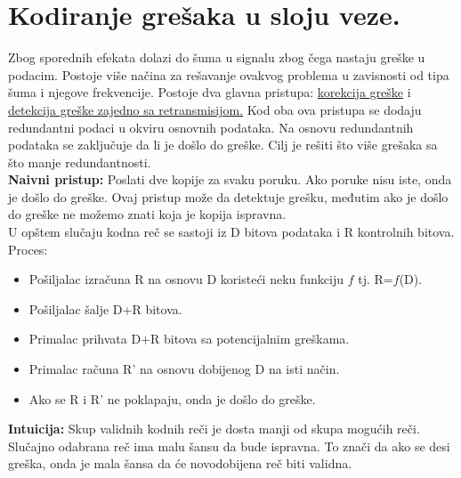 \documentclass[a4paper]{article}
\begin{document}
\section{Kodiranje grešaka u sloju veze.}
    Zbog sporednih efekata dolazi do šuma u signalu zbog čega nastaju greške u podacim. Postoje
    više načina za rešavanje ovakvog problema u zavisnosti od tipa šuma i njegove frekvencije.
    Postoje dva glavna pristupa: \underline{korekcija greške} i \underline{detekcija greške zajedno sa 
    retransmisijom.}
    Kod oba ova pristupa se dodaju redundantni podaci u okviru osnovnih podataka. Na osnovu
    redundantnih podataka se zaključuje da li je došlo do greške. Cilj je rešiti što više grešaka
    sa što manje redundantnosti.\\

    \textbf{Naivni pristup:} Poslati dve kopije za svaku poruku. Ako poruke nisu iste, onda je došlo
    do greške. Ovaj pristup može da detektuje grešku, međutim ako je došlo do greške ne možemo znati
    koja je kopija ispravna.\\

    U opštem slučaju kodna reč se sastoji iz D bitova podataka i R kontrolnih bitova. Proces:
    \begin{itemize}
        \item Pošiljalac izračuna R na osnovu D koristeći neku funkciju $f$ tj. R=$f$(D). 
        \item Pošiljalac šalje D+R bitova. 
        \item Primalac prihvata D+R bitova sa potencijalnim greškama. 
        \item Primalac računa R' na osnovu dobijenog D na isti način. 
        \item Ako se R i R' ne poklapaju, onda je došlo do greške.
    \end{itemize}

    \textbf{Intuicija:} Skup validnih kodnih reči je dosta manji od skupa mogućih reči. Slučajno
    odabrana reč ima malu šansu da bude ispravna. To znači da ako se desi greška, onda je mala
    šansa da će novodobijena reč biti validna.\\
\end{document}
